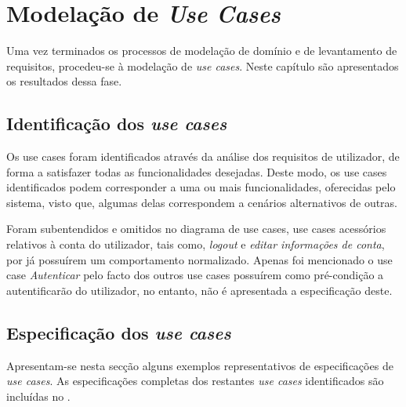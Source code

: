 
\section{Modelação de \emph{Use Cases}}
\label{cap:use-cases}

Uma vez terminados os processos de modelação de domínio e de levantamento de requisitos, procedeu-se à modelação de \emph{use cases}. Neste capítulo são apresentados os resultados dessa fase.


\subsection{Identificação dos \emph{use cases}}
\label{sec:use-cases:identificacao}

Os use cases foram identificados através da análise dos requisitos de utilizador, de forma a satisfazer todas as funcionalidades desejadas. Deste modo, os use cases identificados podem corresponder a uma ou mais funcionalidades, oferecidas pelo sistema, visto que, algumas delas correspondem a cenários alternativos de outras.

Foram subentendidos e omitidos no diagrama de use cases, use cases acessórios relativos à conta do utilizador, tais como, \emph{logout} e \emph{editar informações de conta}, por já possuírem um comportamento normalizado. Apenas foi mencionado o use case \emph{Autenticar} pelo facto dos outros use cases possuírem como pré-condição a autentificarão do utilizador, no entanto, não é apresentada a especificação deste.


\subsection{Especificação dos \emph{use cases}}
\label{sec:use-cases:especificacao}

Apresentam-se nesta secção alguns exemplos representativos de especificações de \emph{use cases}. As especificações completas dos restantes \emph{use cases} identificados são incluídas no .





